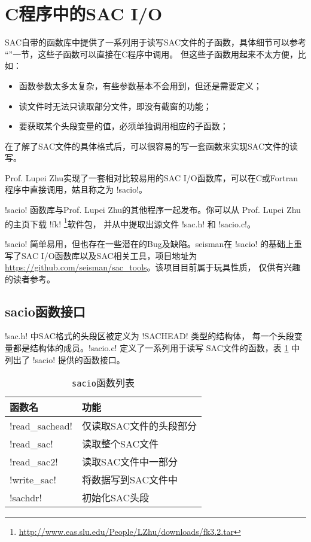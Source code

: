 \section{C程序中的SAC I/O}
SAC自带的函数库中提供了一系列用于读写SAC文件的子函数，具体细节可以参考
``''一节，这些子函数可以直接在C程序中调用。
但这些子函数用起来不太方便，比如：
\begin{itemize}
\item 函数参数太多太复杂，有些参数基本不会用到，但还是需要定义；
\item 读文件时无法只读取部分文件，即没有截窗的功能；
\item 要获取某个头段变量的值，必须单独调用相应的子函数；
\end{itemize}

在了解了SAC文件的具体格式后，可以很容易的写一套函数来实现SAC文件的读写。

Prof. Lupei Zhu实现了一套相对比较易用的SAC I/O函数库，可以在C或Fortran
程序中直接调用，姑且称之为 !sacio!。

!sacio! 函数库与Prof. Lupei Zhu的其他程序一起发布。你可以从
Prof. Lupei Zhu的主页下载 !fk! \footnote{
\url{http://www.eas.slu.edu/People/LZhu/downloads/fk3.2.tar}}软件包，
并从中提取出源文件 !sac.h! 和 !sacio.c!。

!sacio! 简单易用，但也存在一些潜在的Bug及缺陷。seisman在
!sacio! 的基础上重写了SAC I/O函数库以及SAC相关工具，项目地址为
\url{https://github.com/seisman/sac_tools}。该项目目前属于玩具性质，
仅供有兴趣的读者参考。

\subsection{sacio函数接口}
!sac.h! 中SAC格式的头段区被定义为 !SACHEAD! 类型的结构体，
每一个头段变量都是结构体的成员。!sacio.c! 定义了一系列用于读写
SAC文件的函数，表 \ref{table:sacio-function} 中列出了 !sacio!
提供的函数接口。

\begin{table}[H]
\centering
\caption{\texttt{sacio}函数列表}
\label{table:sacio-function}
\begin{tabular}{ll}
\toprule
函数名      &   功能        \\
\midrule
!read_sachead!      &   仅读取SAC文件的头段部分 \\
!read_sac!          &   读取整个SAC文件 \\
!read_sac2!         &   读取SAC文件中一部分 \\
!write_sac!         &   将数据写到SAC文件中 \\
!sachdr!            &   初始化SAC头段\\
\bottomrule
\end{tabular}
\end{table}

